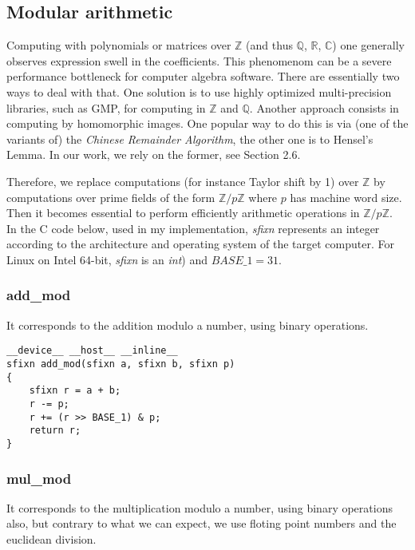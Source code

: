 \newtheorem*{crt1}{Chinese Remainder theorem $1^{st}$ version (CRT1)}
\newtheorem*{crt2}{Chinese Remainder theorem $2^{nd}$ version (CRT2)}

\subsection{Modular arithmetic}

Computing with polynomials or matrices over $\mathbb{Z}$ (and thus  $\mathbb{Q}$,
$\mathbb{R}$, $\mathbb{C}$) one generally observes expression swell in the
coefficients.
This phenomenom can be a severe performance bottleneck for computer algebra
software. 
There are essentially two ways to deal with that.
One solution is to use highly optimized multi-precision libraries, such as GMP, 
for computing in  $\mathbb{Z}$ and $\mathbb{Q}$.
Another approach consists in computing by homomorphic images.
One popular way to do this is via (one of the variants of) 
the {\em Chinese Remainder Algorithm}, the other one is to
Hensel's Lemma.
In our work, we rely on the former, see Section 2.6.

Therefore, we replace computations (for instance Taylor shift by 1) 
over $\mathbb{Z}$ by computations over prime fields
of the form $\mathbb{Z}/p{\mathbb{Z}}$ where $p$ has machine word size.
Then it becomes essential to perform efficiently 
arithmetic operations in  $\mathbb{Z}/p{\mathbb{Z}}$.\\

In the C code below, used in my implementation, \textit{sfixn} represents an integer according to the architecture and operating system of the target computer. 
For Linux on Intel 64-bit, \textit{sfixn} is an \textit{int}) and $BASE\_1 = 31$.

\subsubsection*{add\_mod}
It corresponds to the addition modulo a number, using binary operations.

\begin{verbatim}
__device__ __host__ __inline__ 
sfixn add_mod(sfixn a, sfixn b, sfixn p)
{
    sfixn r = a + b;
    r -= p;
    r += (r >> BASE_1) & p;
    return r;
}
\end{verbatim}

\subsubsection*{mul\_mod}
It corresponds to the multiplication modulo a number, using binary operations also, but contrary to what we can expect, we use floting point numbers and the euclidean division.

